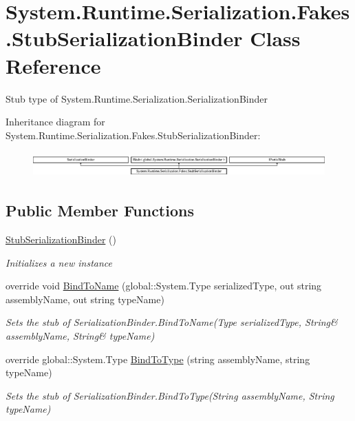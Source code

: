 \hypertarget{class_system_1_1_runtime_1_1_serialization_1_1_fakes_1_1_stub_serialization_binder}{\section{System.\-Runtime.\-Serialization.\-Fakes.\-Stub\-Serialization\-Binder Class Reference}
\label{class_system_1_1_runtime_1_1_serialization_1_1_fakes_1_1_stub_serialization_binder}
}


Stub type of System.\-Runtime.\-Serialization.\-Serialization\-Binder 


Inheritance diagram for System.\-Runtime.\-Serialization.\-Fakes.\-Stub\-Serialization\-Binder\-:\begin{figure}[H]
\begin{center}
\leavevmode
\includegraphics[height=0.979877cm]{class_system_1_1_runtime_1_1_serialization_1_1_fakes_1_1_stub_serialization_binder}
\end{center}
\end{figure}
\subsection*{Public Member Functions}
\begin{DoxyCompactItemize}
\item 
\hyperlink{class_system_1_1_runtime_1_1_serialization_1_1_fakes_1_1_stub_serialization_binder_a0d144a07d7a2c78fd8d38b844a0208ea}{Stub\-Serialization\-Binder} ()
\begin{DoxyCompactList}\small\item\em Initializes a new instance\end{DoxyCompactList}\item 
override void \hyperlink{class_system_1_1_runtime_1_1_serialization_1_1_fakes_1_1_stub_serialization_binder_a925e152938766f5b085dadbb50b51a3d}{Bind\-To\-Name} (global\-::\-System.\-Type serialized\-Type, out string assembly\-Name, out string type\-Name)
\begin{DoxyCompactList}\small\item\em Sets the stub of Serialization\-Binder.\-Bind\-To\-Name(Type serialized\-Type, String\& assembly\-Name, String\& type\-Name)\end{DoxyCompactList}\item 
override global\-::\-System.\-Type \hyperlink{class_system_1_1_runtime_1_1_serialization_1_1_fakes_1_1_stub_serialization_binder_a01843fdaed5344df7af0690b032b5a6e}{Bind\-To\-Type} (string assembly\-Name, string type\-Name)
\begin{DoxyCompactList}\small\item\em Sets the stub of Serialization\-Binder.\-Bind\-To\-Type(\-String assembly\-Name, String type\-Name)\end{DoxyCompactList}\end{DoxyCompactItemize}
